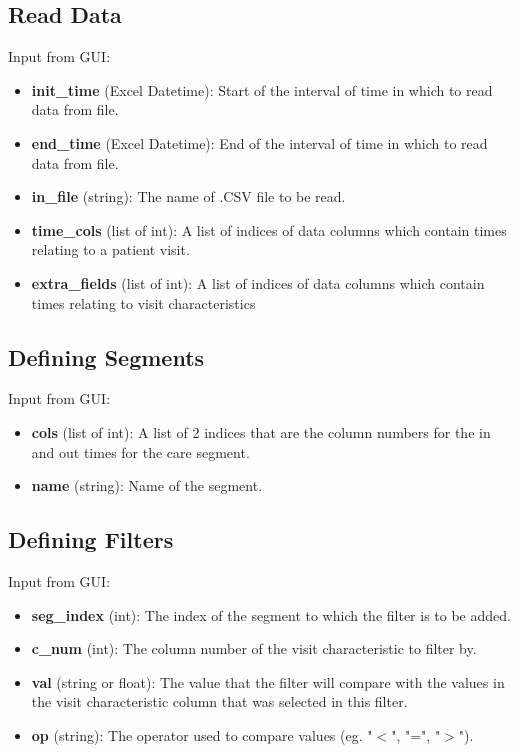 \documentclass{article}
\begin{document}
\subsection*{Read Data}
Input from GUI:

\begin{itemize}
	\item \textbf{init\_time} (Excel Datetime): Start of the interval of time in which to read data from file.
	\item \textbf{end\_time} (Excel Datetime): End of the interval of time in which to read data from file.
	\item \textbf{in\_file} (string): The name of .CSV file to be read.
	\item \textbf{time\_cols} (list of int): A list of indices of data columns which contain times relating to a patient visit.
	\item \textbf{extra\_fields} (list of int): A list of indices of data columns which contain times relating to visit characteristics
\end{itemize}

\subsection*{Defining Segments}
Input from GUI:

\begin{itemize}
	\item \textbf{cols} (list of int): A list of 2 indices that are the column numbers for the in and out times for the care segment.
	\item \textbf{name} (string): Name of the segment.
\end{itemize}

\subsection*{Defining Filters}
Input from GUI:

\begin{itemize}
	\item \textbf{seg\_index} (int): The index of the segment to which the filter is to be added.
	\item \textbf{c\_num} (int): The column number of the visit characteristic to filter by.
	\item \textbf{val} (string or float): The value that the filter will compare with the values in the visit characteristic column that was selected in this filter.
	\item \textbf{op} (string): The operator used to compare values (eg. "$<$", "=", "$>$").
\end{itemize}
\end{document}
